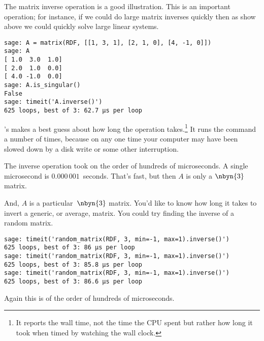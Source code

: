 The matrix inverse operation is a good illustration.
This is an important operation; for instance, if we could do large matrix 
inverses
quickly then as show above we could quickly solve large linear systems.
\begin{lstlisting}
sage: A = matrix(RDF, [[1, 3, 1], [2, 1, 0], [4, -1, 0]])
sage: A
[ 1.0  3.0  1.0]
[ 2.0  1.0  0.0]
[ 4.0 -1.0  0.0]
sage: A.is_singular()
False
sage: timeit('A.inverse()')
625 loops, best of 3: 62.7 μs per loop
\end{lstlisting}
\noindent
\Sage's  makes a best guess about how long
the operation takes.\footnote{%
  It reports the wall time, not the time the CPU
  spent but rather how long it took when timed
  by watching the wall clock.}
It runs the command 
a number of times, because on any one time your
computer may have been slowed down by a 
disk write or some other interruption.

The inverse operation took on the order of hundreds of microseconds.
A single microsecond is 
$0.000\,001$~seconds.
That's fast, but then $A$ is only a $\nbyn{3}$ matrix.

And, $A$ is a particular~$\nbyn{3}$ matrix. 
You'd like to know
how long it takes to invert a generic, or average, matrix.
You could try finding the inverse of a random matrix.
\begin{lstlisting}
sage: timeit('random_matrix(RDF, 3, min=-1, max=1).inverse()')
625 loops, best of 3: 86 μs per loop
sage: timeit('random_matrix(RDF, 3, min=-1, max=1).inverse()')
625 loops, best of 3: 85.8 μs per loop
sage: timeit('random_matrix(RDF, 3, min=-1, max=1).inverse()')
625 loops, best of 3: 86.6 μs per loop
\end{lstlisting}
\noindent
Again this is of the order of hundreds of microseconds.

